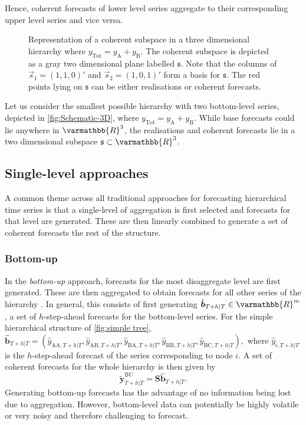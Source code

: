 \documentclass[graybox]{svmult}
\begin{document}
Hence, coherent forecasts of lower level series aggregate to their corresponding upper level series and vice versa.

\begin{figure}[!b]
	\centering
	\vspace{-0.9cm}
	\small
	\resizebox{\linewidth}{!}{
		
	}
	\caption{Representation of a coherent subspace in a three dimensional hierarchy where $y_{\text{Tot}} = y_{\text{A}} + y_{\text{B}}$. The coherent subspace is depicted as a gray two dimensional plane labelled $\mathfrak{s}$. Note that the columns of $\vec{s}_1 = (1,1,0)'$ and $\vec{s}_2 = (1, 0, 1)'$ form a basis for $\mathfrak{s}$. The red points lying on $\mathfrak{s}$ can be either realisations or coherent forecasts.}\label{fig:Schematic-3D}
\end{figure}

Let us consider the smallest possible hierarchy with two bottom-level series, depicted in \autoref{fig:Schematic-3D}, where $y_{\text{Tot}} = y_{\text{A}} + y_{\text{B}}$. While base forecasts could lie anywhere in $\varmathbb{R}^3$, the realisations and coherent forecasts lie in a two dimensional subspace $\mathfrak{s}\subset \varmathbb{R}^3$.

\subsection{Single-level approaches}\label{sec:single level approaches}
A common theme across all traditional approaches for forecasting hierarchical time series is that a single-level of aggregation is first selected and forecasts for that level are generated. These are then linearly combined to generate a set of coherent forecasts the rest of the structure.

\subsubsection{Bottom-up}

In the \textit{bottom-up} approach, forecasts for the most disaggregate level are first generated. These are then aggregated to obtain forecasts for all other series of the hierarchy \citep{dunn1976}. In general, this consists of first generating $\hat{\bm{b}}_{T+h|T} \in \varmathbb{R}^m$, a set of $h$-step-ahead forecasts for the bottom-level series. For the simple hierarchical structure of \autoref{fig:simple tree}, $\hat{\bm{b}}_{T+h|T} = (\hat{{y}}_{\text{AA},T+h|T}, \hat{{y}}_{\text{AB},T+h|T}, \hat{{y}}_{\text{BA},T+h|T}, \hat{{y}}_{\text{BB},T+h|T},\hat{{y}}_{\text{BC},T+h|T}),$ where $\hat{{y}}_{i,T+h|T}$ is the $h$-step-ahead forecast of the series corresponding to node $i$. A set of coherent forecasts for the whole hierarchy is then given by
\begin{equation*}\label{eq:BU}
	\tilde{\bm{y}}^{\text{BU}}_{T+h|T}=\bm{S\hat{\bm{b}}}_{T+h|T}.
\end{equation*}
Generating bottom-up forecasts has the advantage of no information being lost due to aggregation. However, bottom-level data can potentially be highly volatile or very noisy and therefore challenging to forecast.
\end{document}
